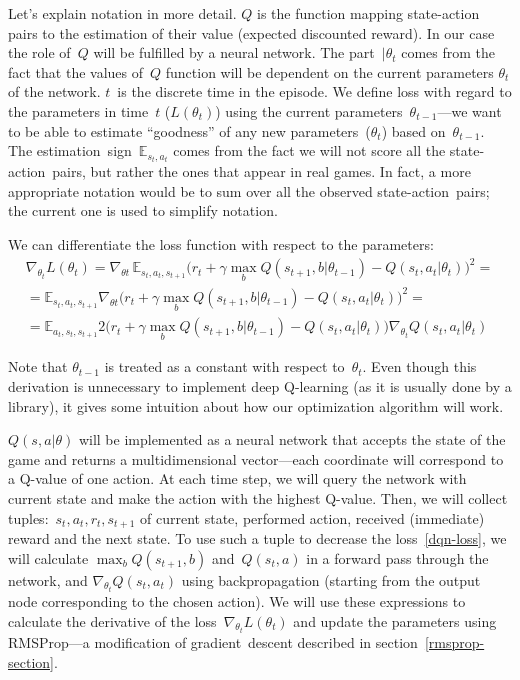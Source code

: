 Let's explain notation in more detail. $Q$ is the function mapping state-action pairs to the estimation of their value (expected discounted reward). In our case the role of~$Q$ will be fulfilled by a neural network. The part~$|\theta_t$ comes from the fact that the values of~$Q$ function will be dependent on the current parameters $\theta_t$ of the network. $t$~is the discrete time in the episode. We define loss with regard to the parameters in time~$t$ ($L(\theta_t)$) using the current parameters~$\theta_{t-1}$---we want to be able to estimate ``goodness'' of any new parameters~($\theta_t$) based on~$\theta_{t-1}$. The estimation~sign~$\mathbb{E}_{s_t, a_t}$ comes from the fact we will not score all the state-action~pairs, but rather the ones that appear in real games. In fact, a more appropriate notation would be to sum over all the observed state-action~pairs; the current one is used to simplify notation.

We can differentiate the loss function with respect to the parameters:
\begin{multline}
  \nabla_{\theta_t} L(\theta_t) = \nabla_{\theta t}\, \mathbb{E}_{s_t, a_t, s_{t+1}} \big(r_t + \gamma \max_b Q(s_{t+1}, b|\theta_{t-1}) - Q(s_t, a_t|\theta_t)\big)^2
 =\\=
  \mathbb{E}_{s_t, a_t, s_{t+1}} \nabla_{\theta t} \big(r_t + \gamma \max_b Q(s_{t+1}, b|\theta_{t-1}) - Q(s_t, a_t|\theta_t)\big)^2
  =\\=
  \mathbb{E}_{a_t,s_t, s_{t+1}} 2\Big(
  r_t + \gamma \max_b Q(s_{t+1}, b|\theta_{t-1}) - Q(s_t, a_t|\theta_t)\Big)
  \nabla_{\theta_t} Q(s_t, a_t|\theta_t)
\end{multline}

Note that $\theta_{t-1}$ is treated as a constant with respect to~$\theta_t$. Even though this derivation is unnecessary to implement deep Q-learning (as it is usually done by a library), it gives some intuition about how our optimization algorithm will work.

$Q(s, a|\theta)$ will be implemented as a neural network that accepts the state of the game and returns a multidimensional vector---each coordinate will correspond to a Q-value of one action. At each time step, we will query the network with current state and make the action with the highest Q-value.
Then, we will collect tuples:~$s_t, a_t, r_t, s_{t+1}$ of current state, performed action, received (immediate) reward and the next state. To use such a tuple to decrease the loss~\eqref{dqn-loss}, we will calculate $\max_b Q(s_{t+1}, b)$ and~$Q(s_t, a)$ in a forward pass through the network, and $\nabla_{\theta_t} Q(s_t, a_t)$ using backpropagation (starting from the output node corresponding to the chosen action). We will use these expressions to calculate the derivative of the loss~$\nabla_{\theta_t} L(\theta_t)$ and update the parameters using RMSProp---a modification of gradient~descent described in section~\ref{rmsprop-section}.

